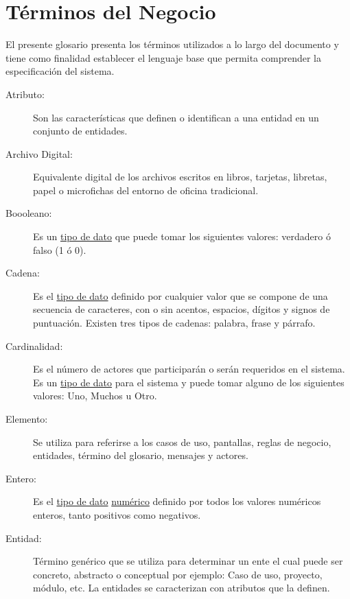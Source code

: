 \section{Términos del Negocio}
\label{sec:terminosDeNegocio}

El presente glosario presenta los términos utilizados a lo largo del documento y tiene como finalidad establecer el lenguaje base que permita comprender la especificación del sistema.

\begin{description}
	\item[\hypertarget{tAtributo}{Atributo:}] Son las características que definen o identifican a una entidad en un conjunto de entidades. 
	\item[\hypertarget{tArchivoDigital}{Archivo Digital:}] Equivalente digital de los archivos escritos en libros, tarjetas, libretas, papel o microfichas del entorno de oficina tradicional.
	
	\item[\hypertarget{tBooleano}{Boooleano:}] Es un \hyperlink{tTipoDato}{tipo de dato} que puede tomar los siguientes valores: verdadero ó falso (1 ó 0).	
	\item[\hypertarget{tCadena}{Cadena:}] Es el \hyperlink{tTipoDato}{tipo de dato} definido por cualquier valor que se compone de una secuencia de caracteres, con o sin acentos, espacios, dígitos y signos de puntuación. Existen tres tipos de cadenas: palabra, frase y párrafo.
	
	\item[\hypertarget{tCardinalidad}{Cardinalidad:}] Es el número de actores que participarán o serán requeridos en el sistema. Es un \hyperlink{tTipoDato}{tipo de dato} para el sistema y puede tomar alguno de los siguientes valores: Uno, Muchos u Otro.
	
	\item[\hypertarget{tElemento}{Elemento:}] Se utiliza para referirse a los casos de uso, pantallas, reglas de negocio, entidades, término del glosario, mensajes y actores. 

	\item[\hypertarget{tEntero}{Entero:}] Es el \hyperlink{tTipoDato}{tipo de dato} \hyperlink{tNumerico}{numérico} definido por todos los valores numéricos enteros, tanto positivos como negativos.
	
	\item[\hypertarget{tEntidad}{Entidad:}] Término genérico que se utiliza para determinar un ente el cual puede ser concreto, abstracto o conceptual por ejemplo: Caso de uso, proyecto, módulo, etc. La entidades se caracterizan con atributos que la definen.
	

\end{description}
